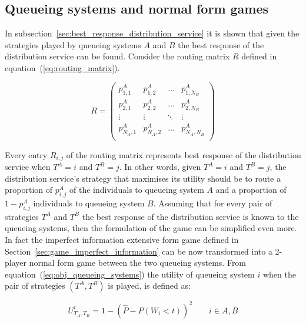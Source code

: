 \subsection{Queueing systems and normal form games}

In subsection~\ref{sec:best_response_distribution_service} it is shown that
given the strategies played by queueing systems \(A\) and \(B\) the best
response of the distribution service can be found.
Consider the routing matrix \(R\) defined in equation~(\ref{eq:routing_matrix}).

\begin{equation*}
    R =
    \begin{pmatrix}
        p_{1,1}^A & p_{1,2}^A & \dots & p_{1,N_B}^A \\
        p_{2,1}^A & p_{2,2}^A & \dots & p_{2,N_B}^A \\
        \vdots & \vdots & \ddots & \vdots \\
        p_{N_A,1}^A & p_{N_A,2}^A & \dots & p_{N_A,N_B}^A \\
    \end{pmatrix}
\end{equation*}

Every entry \(R_{i,j}\) of the routing matrix represents best response of
the distribution service when \(T^A=i\) and \(T^B=j\).
In other words, given \(T^A=i\) and \(T^B=j\), the distribution service's
strategy that maximises its utility should be to route a proportion of
\(p^A_{i,j}\) of the individuals to queueing system \(A\) and a proportion of
\(1 - p^A_{i,j}\) individuals to queueing system \(B\).
Assuming that for every pair of strategies \(T^A\) and \(T^B\) the best response
of the distribution service is known to the queueing systems, then the
formulation of the game can be simplified even more.
In fact the imperfect information extensive form game defined in
Section~\ref{sec:game_imperfect_information} can be now transformed into a
2-player normal form game between the two queueing systems.
From equation~(\ref{eq:obj_queueing_systems}) the utility of queueing system
\(i\) when the pair of strategies \((T^A, T^B)\) is played, is defined as:

\begin{equation}\label{eq:utility_queueing_systems}
    U_{T_A, T_B}^i = 1 - \left( \hat{P} - P(W_i < t) \right)^2
    \qquad i \in {A, B}
\end{equation}

